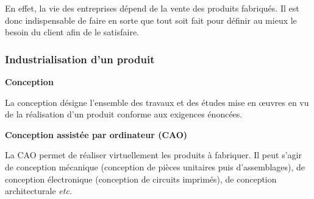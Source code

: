 \documentclass[11pt,oneside]{article}
\begin{document}
En effet, la vie des entreprises dépend de la vente des produits fabriqués. Il est donc indispensable de faire en sorte que tout soit fait pour définir au mieux le besoin du client afin de le satisfaire. 


\subsubsection{Industrialisation d'un produit}
\begin{defi}
\textbf{Conception}

La conception désigne l'ensemble des travaux et des études mise en \oe{}uvres en vu de la réalisation d'un produit conforme aux exigences énoncées.


\textbf{Conception assistée par ordinateur (CAO)}

La CAO permet de réaliser virtuellement les produits à fabriquer. Il peut s'agir de conception mécanique (conception de pièces unitaires puis d'assemblages), de conception électronique (conception de circuits imprimés), de conception architecturale \textit{etc}.

\end{defi}
\end{document}
